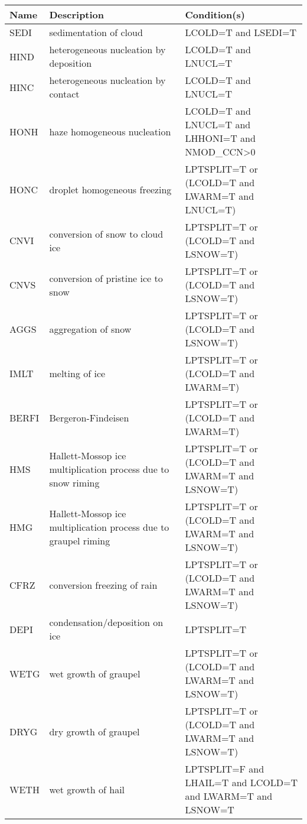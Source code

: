 \begin{longtable} {|p{}|p{}|p{}|}
\hline
Name & Description & Condition(s) \\
\hline \hline
\endhead
SEDI   & sedimentation of cloud                         & LCOLD=T and LSEDI=T \\\hline
HIND   & heterogeneous nucleation by deposition         & LCOLD=T and LNUCL=T \\\hline
HINC   & heterogeneous nucleation by contact            & LCOLD=T and LNUCL=T \\\hline
HONH   & haze homogeneous nucleation                    & LCOLD=T and LNUCL=T and LHHONI=T and NMOD\_CCN>0 \\\hline
HONC   & droplet homogeneous freezing                   & LPTSPLIT=T or (LCOLD=T and LWARM=T and LNUCL=T) \\\hline
CNVI   & conversion of snow to cloud ice                & LPTSPLIT=T or (LCOLD=T and LSNOW=T) \\\hline
CNVS   & conversion of pristine ice to snow             & LPTSPLIT=T or (LCOLD=T and LSNOW=T) \\\hline
AGGS   & aggregation of snow                            & LPTSPLIT=T or (LCOLD=T and LSNOW=T) \\\hline
IMLT   & melting of ice                                 & LPTSPLIT=T or (LCOLD=T and LWARM=T) \\\hline
BERFI  & Bergeron-Findeisen                             & LPTSPLIT=T or (LCOLD=T and LWARM=T) \\\hline
HMS    & Hallett-Mossop ice multiplication process due to snow riming    & LPTSPLIT=T or (LCOLD=T and LWARM=T and LSNOW=T) \\\hline
HMG    & Hallett-Mossop ice multiplication process due to graupel riming & LPTSPLIT=T or (LCOLD=T and LWARM=T and LSNOW=T) \\\hline
CFRZ   & conversion freezing of rain                    & LPTSPLIT=T or (LCOLD=T and LWARM=T and LSNOW=T) \\\hline
DEPI   & condensation/deposition on ice                 & LPTSPLIT=T \\\hline
WETG   & wet growth of graupel                          & LPTSPLIT=T or (LCOLD=T and LWARM=T and LSNOW=T) \\\hline
DRYG   & dry growth of graupel                          & LPTSPLIT=T or (LCOLD=T and LWARM=T and LSNOW=T) \\\hline
WETH   & wet growth of hail                             & LPTSPLIT=F and LHAIL=T and LCOLD=T and LWARM=T and LSNOW=T \\\hline

\end{longtable}
